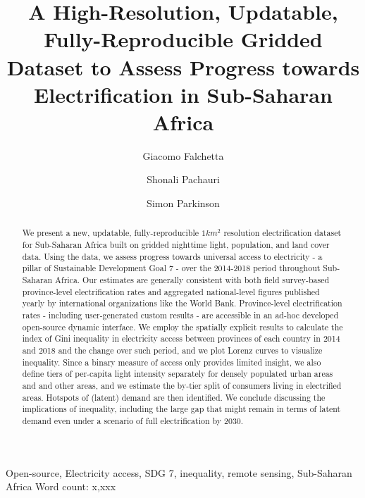 \documentclass[preprint,12pt]{elsarticle}
\begin{document}
\begin{frontmatter}

\title{A High-Resolution, Updatable, Fully-Reproducible Gridded Dataset to Assess Progress towards Electrification in Sub-Saharan Africa}

\author[uno,due]{Giacomo Falchetta}

\author[due]{Shonali Pachauri}
\author[due]{Simon Parkinson}



\address[uno]{Fondazione Eni Enrico Mattei (FEEM), Corso Magenta 63, 2013 , Milan, Italy}
\address[due]{International Institute for Applied Systems Analysis, Schossplatz 1, Laxenburg, Austria}

\begin{abstract}
We present a new, updatable, fully-reproducible $1 km^2$ resolution electrification dataset for Sub-Saharan Africa built on gridded nighttime light, population, and land cover data. Using the data, we assess progress towards universal access to electricity - a pillar of Sustainable Development Goal 7 - over the 2014-2018 period throughout Sub-Saharan Africa. Our estimates are generally consistent with both field survey-based province-level electrification rates and aggregated national-level figures published yearly by international organizations like the World Bank. Province-level electrification rates - including user-generated custom results - are accessible in an ad-hoc developed open-source dynamic interface. We employ the spatially explicit results to calculate the index of Gini inequality in electricity access between provinces of each country in 2014 and 2018 and the change over such period, and we plot Lorenz curves to visualize inequality. Since a binary measure of access only provides limited insight, we also  define tiers of per-capita light intensity separately for densely populated urban areas and and other areas, and we estimate the by-tier split of consumers living in electrified areas. Hotspots of (latent) demand are then identified. We conclude discussing the implications of inequality, including the large gap that might remain in terms of latent demand even under a scenario of full electrification by 2030. 
\end{abstract}


\begin{keyword}
Open-source, Electricity access, SDG 7, inequality, remote sensing, Sub-Saharan Africa \newline
Word count: x,xxx 
\end{keyword}
\end{frontmatter}
\linenumbers
\end{document}
